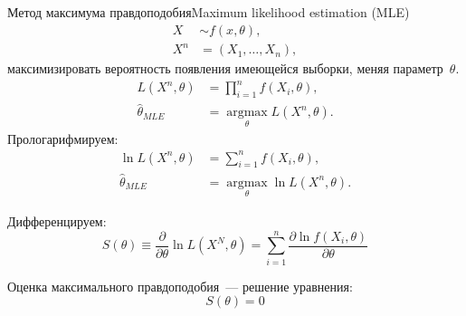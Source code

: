 \documentclass[11pt,pdf,utf8,hyperref={unicode},aspectratio=169]{beamer}
\def\argmax#1{ \mathop{\text{argmax}}\limits_{#1} }
\begin{document}
\begin{frame}[allowframebreaks]{Метод максимума правдоподобия}{Maximum likelihood estimation (MLE)}
	\begin{align*}
	X  &\sim f\left(x, \theta\right), \\
	X^n&=\left(X_1,\dots,X_n\right),
    \end{align*}
   максимизировать вероятность появления имеющейся выборки, меняя параметр~$\theta$.
	\begin{align*}
	L\left(X^n,\theta\right) &= \prod\limits_{i=1}^n f\left(X_i, \theta\right), \\
	\hat{\theta}_{MLE} &= \argmax{\theta} L\left( X^n, \theta \right).
	\end{align*}
	Прологарифмируем:
	\begin{align*}
	\ln L\left(X^n,\theta\right) &= \sum\limits_{i=1}^n f\left(X_i, \theta\right), \\
	\hat{\theta}_{MLE} &= \argmax{\theta} \ln L\left( X^n, \theta \right).
	\end{align*}


	Дифференцируем:
	$$
        S\left(\theta\right) \equiv \frac{\partial}{\partial \theta} \ln L\left(X^N, \theta\right) =
        \sum_{i=1}^n \frac{\partial \ln f(X_i,\theta)}{\partial\theta}
    $$

    Оценка максимального правдоподобия~--- решение уравнения:
	$$S\left(\theta\right)=0$$
\end{frame}
\end{document}
